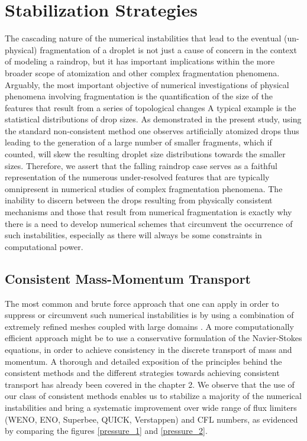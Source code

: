 \section{Stabilization Strategies}

The cascading nature of the numerical instabilities that lead to 
the eventual (un-physical) fragmentation of a droplet is not just a 
cause of concern in the context of modeling a raindrop, but it has important
implications within the more broader scope of 
atomization and other complex fragmentation phenomena. 
Arguably, the most important objective of numerical investigations of physical
phenomena involving fragmentation is the quantification of the size of 
the features that result from a series of topological changes 
A typical example is the statistical distributions of drop sizes. 
As demonstrated in the present study, using the standard non-consistent method  
one observes artificially atomized drops thus leading to the generation of a large number of 
smaller fragments, which if counted, will skew the resulting droplet size 
distributions towards the smaller sizes.
Therefore, we assert that the falling raindrop case serves as a faithful representation of the 
numerous under-resolved features that are typically omnipresent in
numerical studies of complex fragmentation phenomena.  
The inability to discern between the drops resulting from physically consistent 
mechanisms and those that result from numerical fragmentation is exactly
why there is a need to develop numerical schemes that circumvent the occurrence
of such instabilities, especially as there will always be some constraints in computational power.  


\subsection*{Consistent Mass-Momentum Transport}

The most common and brute force approach that one can apply 
in order to suppress or circumvent such numerical instabilities is 
by using a combination of extremely refined meshes coupled with large domains \cite{dodd2014}.
A more computationally efficient approach might be to use a 
conservative formulation
of the Navier-Stokes equations, in order
to achieve consistency in the discrete transport of mass and momentum. 
A thorough and detailed exposition of the principles
behind the consistent methods and the different strategies towards achieving consistent
transport has already been covered in the chapter 2.  
We observe that the use of our class of consistent methods 
enables us to stabilize a majority of the numerical
instabilities and bring a systematic improvement over wide range of 
flux limiters (WENO, ENO, Superbee, QUICK, Verstappen) 
and CFL numbers, as evidenced by comparing the figures \ref{pressure_1} and \ref{pressure_2}. 

